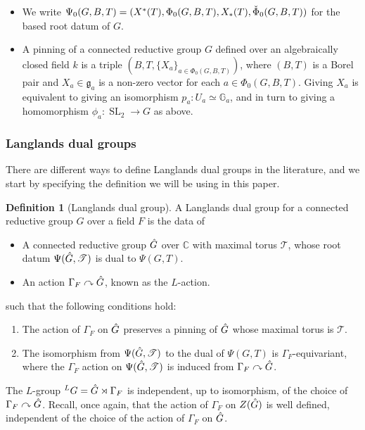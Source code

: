 \documentclass[11pt,a4paper]{article}
\theoremstyle{definition}
\newtheorem{D}[shared]{Definition}
\theoremstyle{plain}
\theoremstyle{remark}
\theoremstyle{plain}
\DeclareMathOperator{\SL}{SL}
\begin{document}
\begin{itemize}
    \item We write $\Psi_0(G,B,T) = (X^*(T), \Phi_0(G,B,T), X_*(T), \Check{\Phi}_0(G,B, T))$ for the based root datum of $G$.
    \item A pinning of a connected reductive group $G$ defined over an algebraically closed field $k$ is a triple $(B,T, \{ X_a \}_{a \in \Phi_0(G,B,T)})$, where $(B,T)$ is a Borel pair and $X_a \in \mathfrak{g}_a$ is a non-zero vector for each $a \in \Phi_0(G,B,T)$. Giving $X_a$ is equivalent to giving an isomorphism $p_a: U_a \simeq \mathbb{G}_a$, and in turn to giving a homomorphism $\phi_a: \SL_2 \xrightarrow{} G$ as above.
\end{itemize}

\subsubsection{Langlands dual groups} 
There are different ways to define Langlands dual groups in the literature, and we start by specifying the definition we will be using in this paper.

\begin{D}[Langlands dual group]\label{Lgroupdef}
    A Langlands dual group for a connected reductive group $G$ over a field $F$ is the data of
    \begin{itemize}
        \item A connected reductive group $\Hat{G}$ over $\mathbb{C}$ with maximal torus $\mathscr{T}$, whose root datum $\Psi(\Hat{G}, \mathscr{T})$ is dual to $\Psi(G,T)$.
        \item An action $\Gamma_F \curvearrowright \Hat{G}$, known as the $L$-action.
    \end{itemize}
    such that the following conditions hold:
    \begin{enumerate}
    \item The action of $\Gamma_F$ on $\Hat{G}$ preserves a pinning of $\Hat{G}$ whose maximal torus is $\mathscr{T}$.
    \item The isomorphism from $\Psi(\Hat{G}, \mathscr{T})$ to the dual of $\Psi(G,T)$ is $\Gamma_F$-equivariant, where the $\Gamma_F$ action on $\Psi(\Hat{G}, \mathscr{T})$ is induced from $\Gamma_F \curvearrowright \Hat{G}$.
    \end{enumerate}
    The $L$-group ${}^L G = \Hat{G} \rtimes \Gamma_F$ is independent, up to isomorphism, of the choice of $\Gamma_F \curvearrowright \Hat{G}$. Recall, once again, that the action of $\Gamma_F$ on $Z(\Hat{G})$ is well defined, independent of the choice of the action of $\Gamma_F$ on $\Hat{G}$.
\end{D}
\end{document}
